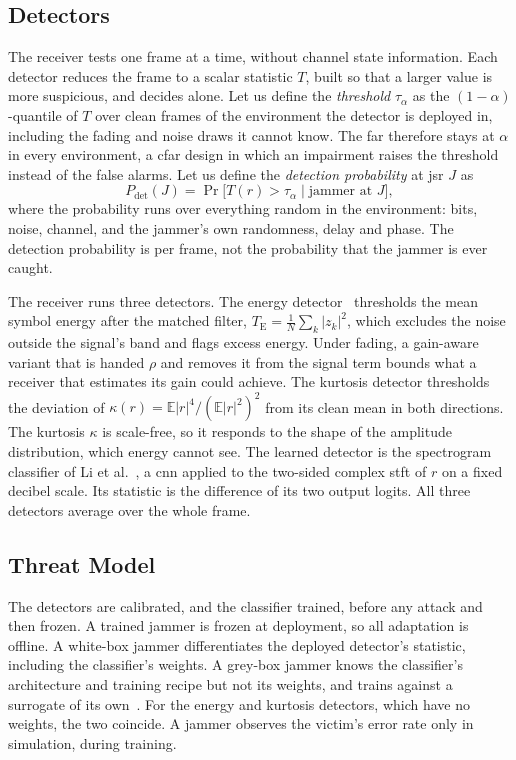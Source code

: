 \subsection{Detectors} \label{sec:sysmodel:detectors}
The receiver tests one frame at a time, without channel state information.
Each detector reduces the frame to a scalar statistic $T$, built so that a larger value is more suspicious, and decides alone.
Let us define the \textit{threshold} $\tau_\alpha$ as the $(1-\alpha)$-quantile of $T$ over clean frames of the environment the detector is deployed in, including the fading and noise draws it cannot know.
The \ac{far} therefore stays at $\alpha$ in every environment, a \ac{cfar} design in which an impairment raises the threshold instead of the false alarms.
Let us define the \textit{detection probability} at \ac{jsr} $J$ as
\begin{equation}
P_\text{det}(J)=\Pr\bigl[T(r)>\tau_\alpha\mid\text{jammer at }J\bigr],
\label{eq:pdet}
\end{equation}
where the probability runs over everything random in the environment: bits, noise, channel, and the jammer's own randomness, delay and phase.
The detection probability is per frame, not the probability that the jammer is ever caught.

The receiver runs three detectors.
The energy detector~\cite{urkowitz1967energy} thresholds the mean symbol energy after the matched filter, $T_\text{E}=\frac1N\sum_k|z_k|^2$, which excludes the noise outside the signal's band and flags excess energy.
Under fading, a gain-aware variant that is handed $\rho$ and removes it from the signal term bounds what a receiver that estimates its gain could achieve.
The kurtosis detector thresholds the deviation of $\kappa(r)=\mathbb{E}|r|^4/(\mathbb{E}|r|^2)^2$ from its clean mean in both directions.
The kurtosis $\kappa$ is scale-free, so it responds to the shape of the amplitude distribution, which energy cannot see.
The learned detector is the spectrogram classifier of Li et al.~\cite{li2022jamming_ofdm}, a \ac{cnn} applied to the two-sided complex \ac{stft} of $r$ on a fixed decibel scale.
Its statistic is the difference of its two output logits.
All three detectors average over the whole frame.

\subsection{Threat Model} \label{sec:sysmodel:threat}
The detectors are calibrated, and the classifier trained, before any attack and then frozen.
A trained jammer is frozen at deployment, so all adaptation is offline.
A white-box jammer differentiates the deployed detector's statistic, including the classifier's weights.
A grey-box jammer knows the classifier's architecture and training recipe but not its weights, and trains against a surrogate of its own~\cite{papernot2017practical}.
For the energy and kurtosis detectors, which have no weights, the two coincide.
A jammer observes the victim's error rate only in simulation, during training.
